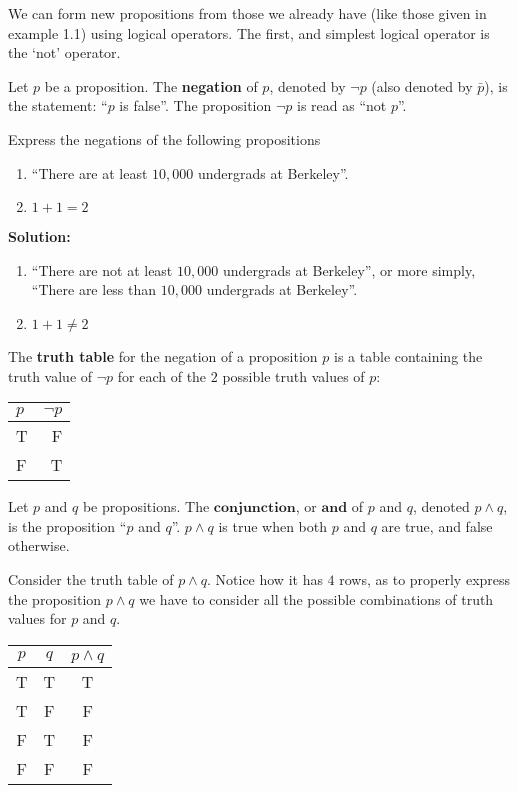 We can form new propositions from those we already have (like those given
in example 1.1) using logical operators. The first, and simplest logical
operator is the `not' operator.

\begin{defn}
  Let $p$ be a proposition. The \textbf{negation} of $p$, denoted by
  $\neg p$ (also denoted by $\bar{p}$), is the statement: ``$p$ is
  false''. The proposition $\neg p$ is read as ``not $p$''.
\end{defn}

\example Express the negations of the following propositions
\begin{enumerate}[nosep]
\item ``There are at least $10,000$ undergrads at Berkeley''.
\item $1+1=2$
\end{enumerate}
\vspace{0cm}
\textbf{Solution:}
\begin{enumerate}[nosep]
\item ``There are not at least $10,000$ undergrads at Berkeley'', or more
  simply, ``There are less than $10,000$ undergrads at Berkeley''.
    \item $1+1\neq 2$
\end{enumerate}

The \textbf{truth table} for the negation of a proposition $p$ is a table
containing the truth value of $\neg p$ for each of the $2$ possible truth
values of $p$:
\begin{table}[h] \centering
  \begin{tabular}{|l|r|}\hline
    $p$ & $\neg p$ \\\hline
    T & F \\\hline
    F & T \\\hline
  \end{tabular}
\end{table}

\begin{defn}
  Let $p$ and $q$ be propositions. The $\textbf{conjunction}$, or
  $\textbf{and}$ of $p$ and $q$, denoted $p\wedge q$, is the proposition
  ``$p$ and $q$''. $p\wedge q$ is true when both $p$ and $q$ are true, and
  false otherwise.
\end{defn}

Consider the truth table of $p\wedge q$. Notice how it has $4$ rows, as to
properly express the proposition $p\wedge q$ we have to consider all the
possible combinations of truth values for $p$ and $q$.
\begin{table}[h] \centering
  \begin{tabular}{|c|c|c|}\hline
    $p$ & $q$ & $p\wedge q$ \\\hline
    T & T & T \\\hline
    T & F & F \\\hline
    F & T & F \\\hline
    F & F & F \\\hline
  \end{tabular}
\end{table}

